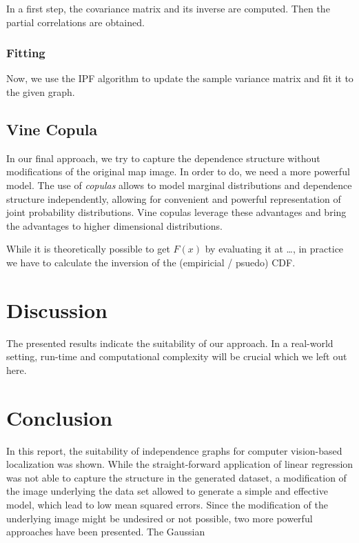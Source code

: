 \documentclass{article}
\begin{document}
In a first step, the covariance matrix and its inverse are
computed. Then the partial correlations are obtained.


\subsubsection{Fitting}

Now, we use the IPF algorithm to update the sample variance matrix and
fit it to the given graph.

\subsection{Vine Copula}

In our final approach, we try to capture the dependence structure
without modifications of the original map image. In order to do, we
need a more powerful model. The use of \emph{copulas} allows to model
marginal distributions and dependence structure independently,
allowing for convenient and powerful representation of joint
probability distributions. Vine copulas leverage these advantages and
bring the advantages to higher dimensional distributions.

While it is theoretically possible to get $F(x)$ by evaluating it at
\ldots, in practice we have to calculate the inversion of the
(empiricial / psuedo) CDF.
                                          
\section{Discussion}

The presented results indicate the suitability of our approach. In a
real-world setting, run-time and computational complexity will be
crucial which we left out here.

\section{Conclusion}

In this report, the suitability of independence graphs for computer
vision-based localization was shown. While the straight-forward
application of linear regression was not able to capture the structure
in the generated dataset, a modification of the image underlying the
data set allowed to generate a simple and effective model, which lead
to low mean squared errors. Since the
modification of the underlying image might be undesired or not
possible, two more powerful approaches have been presented. The
Gaussian 
\end{document}
